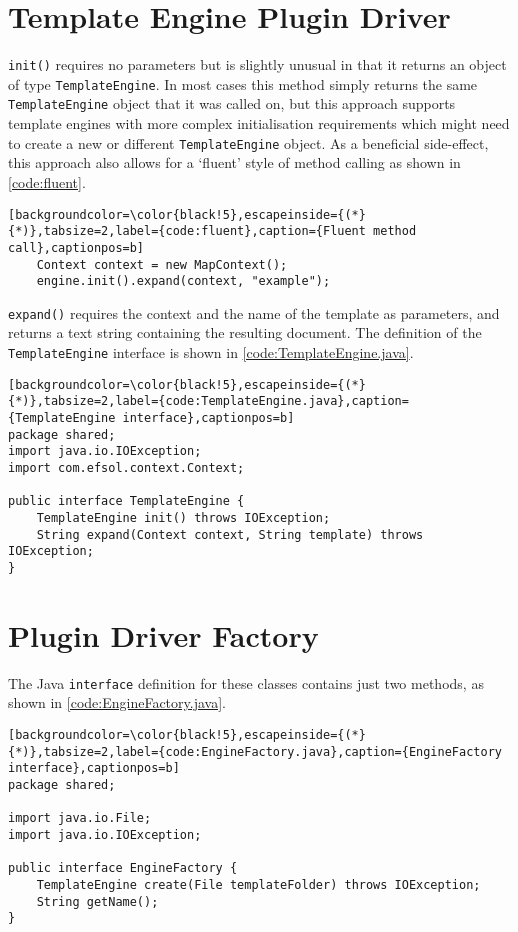 \section*{Template Engine Plugin Driver}
\label{appendix:driver}

\verb!init()! requires no parameters but is slightly unusual in that it returns an object of type \verb!TemplateEngine!. In most cases this method simply returns the same \verb!TemplateEngine! object that it was called on, but this approach supports \gls{template engine}s with more complex initialisation requirements which might need to create a new or different \verb!TemplateEngine! object. As a beneficial side-effect, this approach also allows for a `fluent' style of method calling \citep{JavaDesignPatterns} as shown in \autoref{code:fluent}.

\begin{lstlisting}[backgroundcolor=\color{black!5},escapeinside={(*}{*)},tabsize=2,label={code:fluent},caption={Fluent method call},captionpos=b]
    Context context = new MapContext();
    engine.init().expand(context, "example");
\end{lstlisting}

\verb!expand()! requires the context and the name of the template as parameters, and returns a text string containing the resulting document. The definition of the \verb!TemplateEngine! interface is shown in \autoref{code:TemplateEngine.java}.

\begin{lstlisting}[backgroundcolor=\color{black!5},escapeinside={(*}{*)},tabsize=2,label={code:TemplateEngine.java},caption={TemplateEngine interface},captionpos=b]
package shared;
import java.io.IOException;
import com.efsol.context.Context;

public interface TemplateEngine {
    TemplateEngine init() throws IOException;
    String expand(Context context, String template) throws IOException;
}\end{lstlisting}

\section*{Plugin Driver Factory}
\label{appendix:driverfactory}

The Java \verb!interface! definition for these classes contains just two methods, as shown in \autoref{code:EngineFactory.java}.

\begin{lstlisting}[backgroundcolor=\color{black!5},escapeinside={(*}{*)},tabsize=2,label={code:EngineFactory.java},caption={EngineFactory interface},captionpos=b]
package shared;

import java.io.File;
import java.io.IOException;

public interface EngineFactory {
    TemplateEngine create(File templateFolder) throws IOException;
    String getName();
}
\end{lstlisting}

